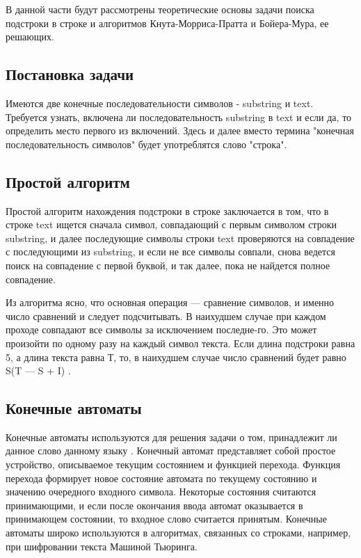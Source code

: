 \documentclass[a4paper, 14pt]{article}
\begin{document}
		В данной части будут рассмотрены теоретические основы задачи поиска подстроки в строке и алгоритмов Кнута-Морриса-Пратта и Бойера-Мура, ее решающих. 
		
\subsection{Постановка задачи}\label{zad} 
	Имеются две конечные последовательности символов \cite{matan} - substring и text. Требуется узнать, включена ли последовательность substring в text и если да, то определить место первого из включений. Здесь и далее вместо термина "конечная последовательность символов" будет употреблятся слово "строка".
	
        \subsection{Простой алгоритм}
        Простой алгоритм нахождения подстроки в строке заключается в том, что в строке text ищется сначала символ, совпадающий с первым символом строки substring, и далее последующие символы строки text проверяются на совпадение с последующими из substring, и если не все символы совпали, снова ведется поиск на совпадение с первой буквой, и так далее, пока не найдется полное совпадение. 
        
        Из алгоритма ясно, что основная операция — сравнение символов, и именно число сравнений и следует подсчитывать. В наихудшем случае при каждом проходе совпадают все символы за исключением последне-го. Это может произойти по одному разу на каждый символ текста. Если длина подстроки равна 5, а длина текста равна Т, то, в наихудшем случае число сравнений будет равно S(T — S + I) \cite{pstr}.

		\subsection{Конечные автоматы}
 		Конечные автоматы используются для решения задачи о том, принадлежит ли данное слово данному языку  \cite{diskr}. Конечный автомат представляет собой простое устройство, описываемое текущим состоянием и функцией перехода. Функция перехода формирует новое состояние автомата по текущему состоянию и значению очередного входного символа. Некоторые состояния считаются принимающими, и если после окончания ввода автомат оказывается в принимающем состоянии, то входное слово считается принятым. Конечные автоматы широко используются в алгоритмах, связанных со строками, например, при шифровании текста Машиной Тьюринга\cite{mt}.
 		
\end{document}

